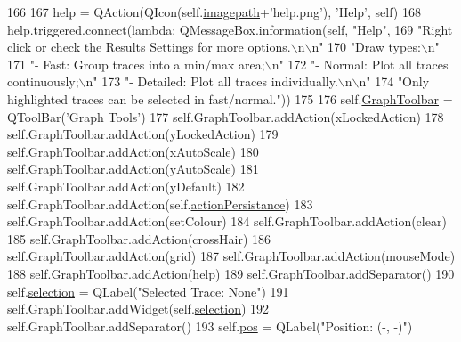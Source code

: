 \begin{DoxyCode}
166 
167         help = QAction(QIcon(self.\hyperlink{classsoftware_1_1chipwhisperer_1_1common_1_1ui_1_1GraphWidget_1_1GraphWidget_af56afe05df7285ee5568bddb9279c7dc}{imagepath}+\textcolor{stringliteral}{'help.png'}), \textcolor{stringliteral}{'Help'}, self)
168         help.triggered.connect(\textcolor{keyword}{lambda}: QMessageBox.information(self, \textcolor{stringliteral}{"Help"},
169                                 \textcolor{stringliteral}{"Right click or check the Results Settings for more options.\(\backslash\)n\(\backslash\)n"}
170                                 \textcolor{stringliteral}{"Draw types:\(\backslash\)n"}
171                                 \textcolor{stringliteral}{"- Fast: Group traces into a min/max area;\(\backslash\)n"}
172                                 \textcolor{stringliteral}{"- Normal: Plot all traces continuously;\(\backslash\)n"}
173                                 \textcolor{stringliteral}{"- Detailed: Plot all traces individually.\(\backslash\)n\(\backslash\)n"}
174                                 \textcolor{stringliteral}{"Only highlighted traces can be selected in fast/normal."}))
175 
176         self.\hyperlink{classsoftware_1_1chipwhisperer_1_1common_1_1ui_1_1GraphWidget_1_1GraphWidget_acf49d34204ce9fbe6f0e7382656579d1}{GraphToolbar} = QToolBar(\textcolor{stringliteral}{'Graph Tools'})
177         self.GraphToolbar.addAction(xLockedAction)
178         self.GraphToolbar.addAction(yLockedAction)
179         self.GraphToolbar.addAction(xAutoScale)
180         self.GraphToolbar.addAction(yAutoScale)
181         self.GraphToolbar.addAction(yDefault)
182         self.GraphToolbar.addAction(self.\hyperlink{classsoftware_1_1chipwhisperer_1_1common_1_1ui_1_1GraphWidget_1_1GraphWidget_a29c60352a68e6e2b73e0761e0fc8e0b2}{actionPersistance})
183         self.GraphToolbar.addAction(setColour)
184         self.GraphToolbar.addAction(clear)
185         self.GraphToolbar.addAction(crossHair)
186         self.GraphToolbar.addAction(grid)
187         self.GraphToolbar.addAction(mouseMode)
188         self.GraphToolbar.addAction(help)
189         self.GraphToolbar.addSeparator()
190         self.\hyperlink{classsoftware_1_1chipwhisperer_1_1common_1_1ui_1_1GraphWidget_1_1GraphWidget_a1af636d2cc4d6ee63ba4f2ab9bcf1e2d}{selection} = QLabel(\textcolor{stringliteral}{"Selected Trace: None"})
191         self.GraphToolbar.addWidget(self.\hyperlink{classsoftware_1_1chipwhisperer_1_1common_1_1ui_1_1GraphWidget_1_1GraphWidget_a1af636d2cc4d6ee63ba4f2ab9bcf1e2d}{selection})
192         self.GraphToolbar.addSeparator()
193         self.\hyperlink{classsoftware_1_1chipwhisperer_1_1common_1_1ui_1_1GraphWidget_1_1GraphWidget_abb96624492154279ba1ba639d5efbbc2}{pos} = QLabel(\textcolor{stringliteral}{"Position: (-, -)"})

\end{DoxyCode}
